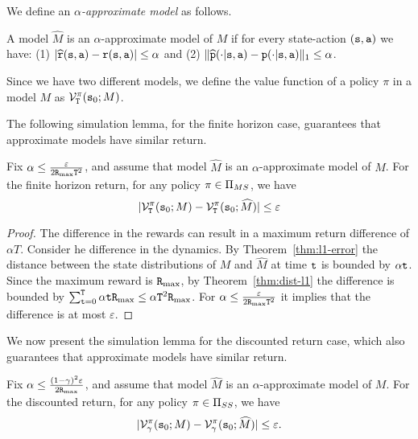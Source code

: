 We define an {\em $\alpha$-approximate model} as follows.
%
\begin{definition}
A model $\widehat{M}$ is an $\alpha$-approximate model of $M$
if for every state-action $({\tt s},{\tt a})$ we have: (1)
$|\widehat{{\tt r}}({\tt s},{\tt a})-{\tt r}({\tt s},{\tt a})|\leq
\alpha$ and (2)
$\|\widehat{{\tt p}}(\cdot|{\tt s},{\tt a})-{\tt p}(\cdot|{\tt s},{\tt a})\|_1\leq\alpha$.
\end{definition}

Since we have two different models, we define the value function of a policy $\pi$ in a model $M$ as $\mathcal{V}^\pi_{\tt T}({\tt s}_0;M)$.

The following simulation lemma, for the finite horizon case,
guarantees that approximate models have similar return.

\begin{lemma}
\label{lemma:approx-model-FH}
%
%
Fix $\alpha\leq \frac{\varepsilon}{2{\tt R}_{\max } {\tt T}^2}$, and
assume that model $\widehat{M}$ is an $\alpha$-approximate model of
$M$. For the finite horizon return, for any policy $\pi \in
 {\Pi _{MS}}$, we have
\[
|\mathcal{V}^\pi_{\tt T}({\tt s}_0;M)-\mathcal{V}^\pi_{\tt T}({\tt s}_0;\widehat{M})|\leq
\varepsilon
\]
\end{lemma}

\begin{proof}
The difference in the rewards can result in a maximum return difference of $\alpha T$. 
Consider he difference in the dynamics.
By Theorem~\ref{thm:l1-error} the distance between the state
distributions of $M$ and $\widehat{M}$ at time ${\tt t}$ is bounded
by $\alpha{\tt t}$. Since the maximum reward  is ${\tt R}_{\max }$, by
Theorem~\ref{thm:dist-l1} the difference is bounded by
$\sum_{{\tt t}=0}^{\tt T} \alpha{\tt t} {\tt R}_{\max }\leq \alpha{\tt T}^2
{\tt R}_{\max }$. For $\alpha\leq \frac{\varepsilon}{2{\tt R}_{\max } {\tt T}^2}$ it
implies that the difference is at most $\varepsilon$.
\end{proof}


We now present the simulation lemma for the discounted return
case, which also guarantees that approximate models have similar
return.

\begin{lemma}
\label{lemma:approx-model-dic}
%
Fix $\alpha\leq \frac{(1-\gamma)^2\varepsilon}{2{\tt R}_{\max }}$, and
assume that model $\widehat{M}$ is an $\alpha$-approximate model of $M$. For the discounted return, for any policy $\pi \in  {\Pi_{SS}}$, we have
\[
|\mathcal{V}^\pi_\gamma({\tt s}_0;M)-\mathcal{V}^\pi_\gamma({\tt s}_0;\widehat{M})|\leq
\varepsilon.
\]
\end{lemma}

